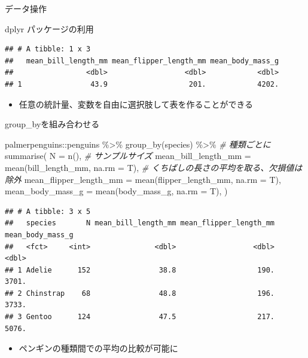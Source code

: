 \documentclass[
  ignorenonframetext,
]{beamer}
\newenvironment{Shaded}{\begin{snugshade}}{\end{snugshade}}
\newcommand{\AttributeTok}[1]{\textcolor[rgb]{0.77,0.63,0.00}{#1}}
\newcommand{\CommentTok}[1]{\textcolor[rgb]{0.56,0.35,0.01}{\textit{#1}}}
\newcommand{\FunctionTok}[1]{\textcolor[rgb]{0.00,0.00,0.00}{#1}}
\newcommand{\NormalTok}[1]{#1}
\newcommand{\SpecialCharTok}[1]{\textcolor[rgb]{0.00,0.00,0.00}{#1}}
\providecommand{\tightlist}{%
  \setlength{\itemsep}{0pt}\setlength{\parskip}{0pt}}
\begin{document}
\begin{frame}[fragile]{データ操作}
\begin{block}{dplyr パッケージの利用}
\begin{verbatim}
## # A tibble: 1 x 3
##   mean_bill_length_mm mean_flipper_length_mm mean_body_mass_g
##                 <dbl>                  <dbl>            <dbl>
## 1                43.9                   201.            4202.
\end{verbatim}

\begin{itemize}
\tightlist
\item
  任意の統計量、変数を自由に選択肢して表を作ることができる
\end{itemize}
\end{block}

\begin{block}{group\_byを組み合わせる}
\protect\hypertarget{group_byux3092ux7d44ux307fux5408ux308fux305bux308b}{}
\begin{Shaded}
\begin{Highlighting}[]
\NormalTok{palmerpenguins}\SpecialCharTok{::}\NormalTok{penguins }\SpecialCharTok{\%\textgreater{}\%}
  \FunctionTok{group\_by}\NormalTok{(species) }\SpecialCharTok{\%\textgreater{}\%} \CommentTok{\# 種類ごとに}
  \FunctionTok{summarise}\NormalTok{(}
    \AttributeTok{N =} \FunctionTok{n}\NormalTok{(), }\CommentTok{\# サンプルサイズ}
    \AttributeTok{mean\_bill\_length\_mm =} \FunctionTok{mean}\NormalTok{(bill\_length\_mm, }\AttributeTok{na.rm =}\NormalTok{ T), }\CommentTok{\# くちばしの長さの平均を取る、欠損値は除外}
    \AttributeTok{mean\_flipper\_length\_mm =} \FunctionTok{mean}\NormalTok{(flipper\_length\_mm, }\AttributeTok{na.rm =}\NormalTok{ T),}
    \AttributeTok{mean\_body\_mass\_g =} \FunctionTok{mean}\NormalTok{(body\_mass\_g, }\AttributeTok{na.rm =}\NormalTok{ T),}
\NormalTok{  )}
\end{Highlighting}
\end{Shaded}

\begin{verbatim}
## # A tibble: 3 x 5
##   species       N mean_bill_length_mm mean_flipper_length_mm mean_body_mass_g
##   <fct>     <int>               <dbl>                  <dbl>            <dbl>
## 1 Adelie      152                38.8                   190.            3701.
## 2 Chinstrap    68                48.8                   196.            3733.
## 3 Gentoo      124                47.5                   217.            5076.
\end{verbatim}

\begin{itemize}
\tightlist
\item
  ペンギンの種類間での平均の比較が可能に
\end{itemize}
\end{block}


\end{frame}
\end{document}
